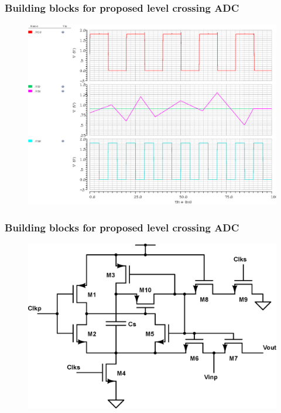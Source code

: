 \begin{frame}
	\frametitle{Building blocks for proposed level crossing ADC} \footnotesize
	\begin{center}
		\begin{figure}
			\includegraphics[width=10 cm, height=6 cm, angle=360]{Figures/SCMP.eps}\\
		\end{figure}
		\scriptsize{ \color{blue}{Simulation results of Clocked Comparator used in proposed ADC architecture}}
	\end{center}
\end{frame}
\begin{frame}
	\frametitle{Building blocks for proposed level crossing ADC} \footnotesize
	\begin{center}
		\begin{figure}
			\includegraphics[width=7 cm]{Figures/TAH.eps} \\
		\end{figure}
		\scriptsize{ \color{blue}{Track and Hold used in proposed ADC architecture}}
	\end{center}
\end{frame}

